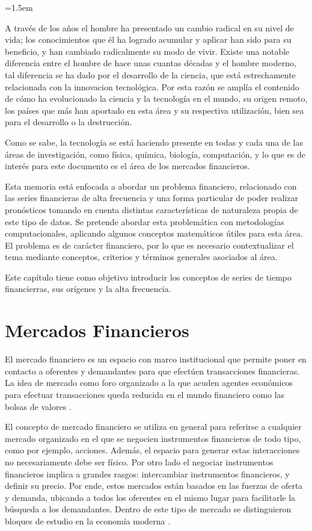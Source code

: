\parindent=1.5em

A través de los años el hombre ha presentado un cambio radical en su nivel de vida; los conocimientos que él ha logrado acumular y aplicar han sido para su beneficio,
y han cambiado radicalmente su modo de vivir. Existe una notable diferencia entre el hombre de hace unas cuantas décadas y el hombre moderno, tal diferencia se ha
dado por el desarrollo de la ciencia, que está estrechamente relacionada con la innovacion tecnológica. Por esta razón se amplía el contenido de cómo ha
evolucionado la ciencia y la tecnología en el mundo, su origen remoto, los países que más han aportado en esta área y su respectiva utilización, bien sea para
el desarrollo o la destrucción.

Como se sabe, la tecnología se está haciendo presente en todas y cada una de las áreas de investigación, como física, química, biología, computación, y lo que es de
interés para este documento es el área de los mercados financieros.

Esta memoria está enfocada a abordar un problema financiero, relacionado con las series financieras de alta frecuencia y una forma particular
de poder realizar pronósticos tomando en cuenta distintas características de naturaleza propia de este tipo de datos. 
Se pretende abordar esta problemática con metodologías computacionales, aplicando algunos conceptos matemáticos
útiles para esta área. El problema es de carácter financiero, por lo que es necesario contextualizar el tema mediante conceptos, criterios 
y términos generales asociados al área.

Este capítulo tiene como objetivo introducir los conceptos de series de tiempo financierras, sus orígenes y la alta frecuencia.

\section{Mercados Financieros}

El mercado financiero es un espacio con marco institucional que permite poner en contacto a oferentes y demandantes para que efectúen
transacciones financieras. La idea de mercado como foro organizado a la que acuden agentes económicos para efectuar transacciones
queda reducida en el mundo financiero como las bolsas de valores \cite{mishkin2006financial}.

El concepto de mercado financiero se utiliza en general para referirse a cualquier mercado organizado en el que se negocien instrumentos financieros
de todo tipo, como por ejemplo, acciones. Además, el espacio para generar estas interacciones no necesariamente debe ser físico. Por otro lado el negociar
instrumentos financieros implica a grandes rasgos: intercambiar instrumentos financieros, y definir su precio. Por ende, estos mercados están basados en
las fuerzas de oferta y demanda, ubicando a todos los oferentes en el mismo lugar para facilitarle la búsqueda a los demandantes. Dentro
de este tipo de mercado se distinguieron bloques de estudio en la economía moderna \cite{jensen1984theory}.

